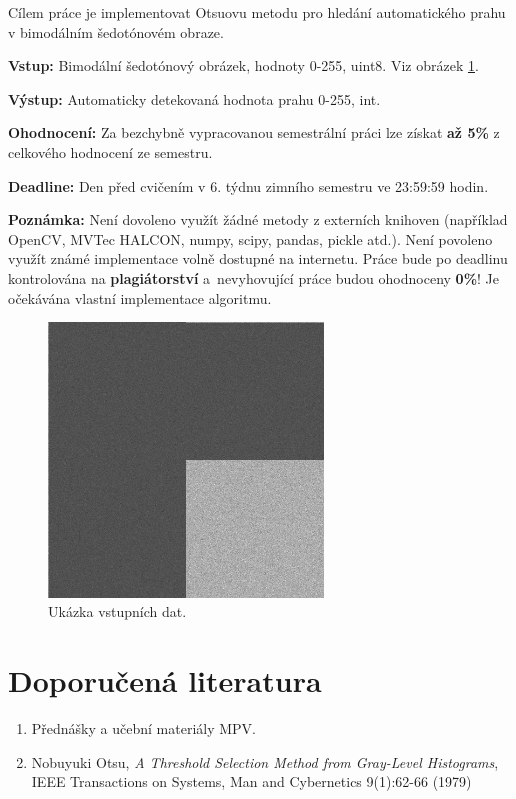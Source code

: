 \documentclass[12pt, a4paper]{article}
\begin{document}
\par{Cílem práce je implementovat Otsuovu metodu pro hledání automatického prahu v bimodálním šedotónovém obraze.}

\par{\textbf{Vstup:} Bimodální šedotónový obrázek, hodnoty 0-255, uint8. Viz obrázek \ref{fig:example}.}

\par{\textbf{Výstup:} Automaticky detekovaná hodnota prahu 0-255, int.}

\par{\textbf{Ohodnocení:} Za bezchybně vypracovanou semestrální práci lze získat \textbf{až 5\%} z celkového hodnocení ze semestru.}

\par{\textbf{Deadline:} Den před cvičením v 6. týdnu zimního semestru ve 23:59:59 hodin.}

\par{\textbf{Poznámka:} Není dovoleno využít žádné metody z externích knihoven (například OpenCV, MVTec HALCON, numpy, scipy, pandas, pickle atd.). Není povoleno využít známé implementace volně dostupné na internetu. Práce bude po deadlinu kontrolována na \textbf{plagiátorství} a~nevyhovující práce budou ohodnoceny \textbf{0\%}! Je očekávána vlastní implementace algoritmu.}

\begin{figure}[!ht]
	\centering
	\includegraphics[width = 0.65\textwidth]{syntheticImg_1.jpg}
	\caption{Ukázka vstupních dat.}	
	\label{fig:example}
\end{figure}

\section*{Doporučená literatura}
\begin{enumerate}
	\item Přednášky a učební materiály MPV.
	\item Nobuyuki Otsu, \textit{A Threshold Selection Method from Gray-Level Histograms}, IEEE Transactions on Systems, Man and Cybernetics 9(1):62-66 (1979)
\end{enumerate}
\end{document}
